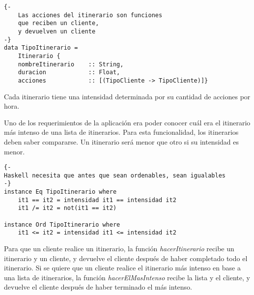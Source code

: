 \begin{lstlisting}
{-
    Las acciones del itinerario son funciones
    que reciben un cliente,
    y devuelven un cliente
-}
data TipoItinerario = 
    Itinerario {
    nombreItinerario    :: String,
    duracion            :: Float,
    acciones            :: [(TipoCliente -> TipoCliente)]}
\end{lstlisting}

Cada itinerario tiene una intensidad determinada por su cantidad de acciones por hora.

Uno de los requerimientos de la aplicación era poder conocer cuál era el itinerario más intenso de una lista de itinerarios. Para esta funcionalidad, los itinerarios deben saber compararse. Un itinerario será menor que otro si su intensidad es menor.

\clearpage
\begin{lstlisting}
{-
Haskell necesita que antes que sean ordenables, sean igualables
-}
instance Eq TipoItinerario where
    it1 == it2 = intensidad it1 == intensidad it2
    it1 /= it2 = not(it1 == it2)

instance Ord TipoItinerario where
    it1 <= it2 = intensidad it1 <= intensidad it2
\end{lstlisting}

Para que un cliente realice un itinerario, la función \emph{hacerItinerario} recibe un itinerario y un cliente, y devuelve el cliente después de haber completado todo el itinerario. Si se quiere que un cliente realice el itinerario más intenso en base a una lista de itinerarios, la función \emph{hacerElMasIntenso} recibe la lista y el cliente, y devuelve el cliente después de haber terminado el más intenso.

\clearpage
\printbibliography



\subsection{}
\emph{} 

~\\
